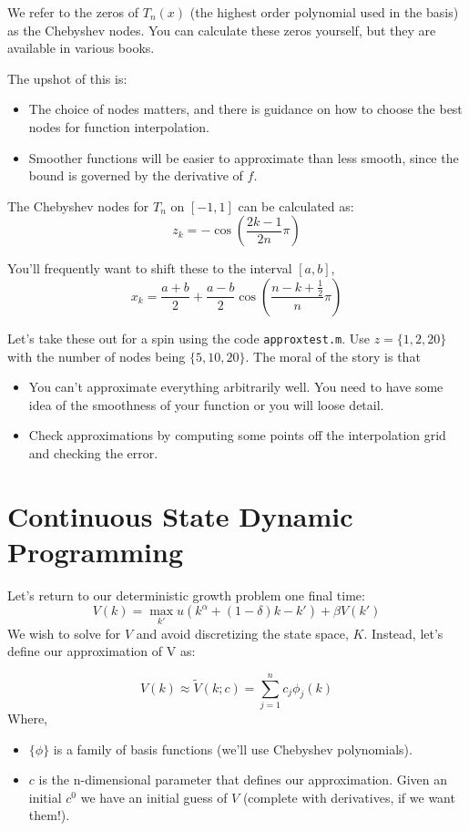 \documentclass[twoside]{article}
\begin{document}
We refer to the zeros of $T_n(x)$ (the highest order polynomial used in the basis) as the Chebyshev nodes. You can calculate these zeros yourself, but they are available in various books. 

The upshot of this is: 
\begin{itemize}
\item The choice of nodes matters, and there is guidance on how to choose the best nodes for function interpolation. 
\item Smoother functions will be easier to approximate than less smooth, since the bound is governed by the derivative of $f$. 
\end{itemize}

The Chebyshev nodes for $T_n$ on $[-1, 1]$ can be calculated as: 
$$z_k = -\cos\left( \frac{2k-1}{2n} \pi \right)$$

You'll frequently want to shift these to the interval $[a, b]$, 
$$x_k = \frac{a + b}{2} + \frac{a-b}{2} \cos \left(\frac{n - k + \frac{1}{2}}{n} \pi \right) $$

Let's take these out for a spin using the code {\tt approxtest.m}. Use $z = \{1, 2, 20\}$ with the number of nodes being $\{5, 10, 20\}$. The moral of the
story is that
\begin{itemize}
\item You can't approximate everything arbitrarily well. You need to have some idea of the smoothness of your function or you will loose detail. 
\item Check approximations by computing some points off the interpolation grid and checking the error. 
\end{itemize}

\section{Continuous State Dynamic Programming}

Let's return to our deterministic growth problem one final time: 
$$V(k) = \max_{k'} u(k^\alpha + (1-\delta)k - k') + \beta V(k') $$
We wish to solve for $V$ and avoid discretizing the state space, $K$. Instead, let's define our approximation of V as:

$$V(k) \approx \tilde{V}(k; c) = \sum_{j=1}^n c_j \phi_j(k)$$
Where, 
\begin{itemize}
\item $\{\phi\}$ is a family of basis functions (we'll use Chebyshev polynomials). 
\item $c$ is the n-dimensional parameter that defines our approximation. Given an initial $c^0$ we have an initial guess of $V$ (complete with derivatives, if we want them!). 
\end{itemize}
\end{document}
